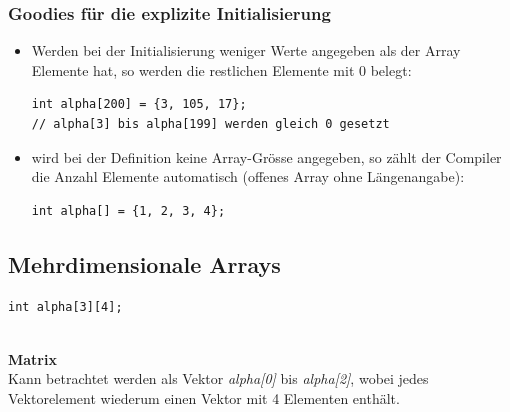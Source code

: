 \subsubsection{Goodies für die explizite Initialisierung}
\begin{itemize}
	\item Werden bei der Initialisierung weniger Werte angegeben als der Array Elemente hat, so werden die restlichen Elemente mit 0 belegt:
	\hspace{0.01\linewidth}
	\begin{minipage}{0.7\linewidth}
	\vspace{-\baselineskip}
\begin{lstlisting}
int alpha[200] = {3, 105, 17}; 
// alpha[3] bis alpha[199] werden gleich 0 gesetzt
\end{lstlisting}
	\end{minipage}%
	\item wird bei der Definition keine Array-Grösse angegeben, so zählt der Compiler die Anzahl Elemente automatisch (offenes Array ohne Längenangabe):
	\hspace{0.01\linewidth}
	\begin{minipage}{0.4\linewidth}
	\vspace{-\baselineskip}
\begin{lstlisting}
int alpha[] = {1, 2, 3, 4};
\end{lstlisting}
	\end{minipage}
\end{itemize}

\subsection{Mehrdimensionale Arrays}
\vspace{-\baselineskip}
\begin{minipage}{0.2\linewidth}
\begin{lstlisting}
int alpha[3][4];
\end{lstlisting}
\end{minipage}
\hspace{0.01\linewidth}
\begin{minipage}{0.3\linewidth}
	
\end{minipage}\\
\textbf{Matrix}\\
Kann betrachtet werden als Vektor \emph{alpha[0]} bis \emph{alpha[2]}, wobei jedes Vektorelement wiederum einen Vektor mit 4 Elementen enthält.

